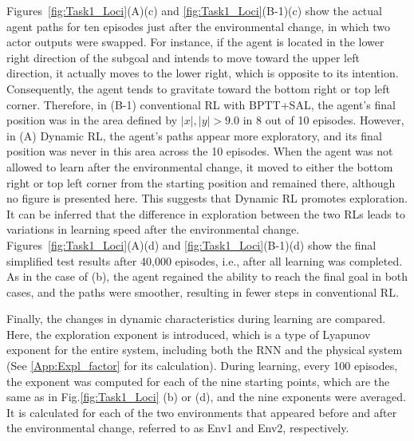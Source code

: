 Figures~\ref{fig:Task1_Loci}(A)(c) and \ref{fig:Task1_Loci}(B-1)(c) show the actual agent paths
for ten episodes just after the environmental change,
in which two actor outputs were swapped.
For instance, if the agent is located in the lower right direction of the subgoal
and intends to move toward the upper left direction, it actually moves to the lower right, which is opposite to its intention.
Consequently, the agent tends to gravitate toward the bottom right or top left corner.
Therefore, in (B-1) conventional RL with BPTT+SAL,
the agent's final position was in the area defined by $|x|, |y| > 9.0$ in 8 out of 10 episodes.
However, in (A) Dynamic RL, the agent's paths appear more exploratory,
and its final position was never in this area across the 10 episodes.
When the agent was not allowed to learn after the environmental change,
it moved to either the bottom right or top left corner from the starting position and remained there,
although no figure is presented here.
This suggests that Dynamic RL promotes exploration.
It can be inferred that the difference in exploration between the two RLs leads to variations in learning speed
after the environmental change.
Figures~\ref{fig:Task1_Loci}(A)(d) and \ref{fig:Task1_Loci}(B-1)(d) show the final simplified test results
after 40,000 episodes, i.e., after all learning was completed.
As in the case of (b), the agent regained the ability to reach the final goal in both cases,
and the paths were smoother, resulting in fewer steps in conventional RL.

Finally, the changes in dynamic characteristics during learning are compared.
Here, the exploration exponent is introduced, which is a type of Lyapunov exponent for the entire system, including
both the RNN and the physical system (See \ref{App:Expl_factor} for its calculation).
During learning, every 100 episodes, the exponent was computed for each of the nine starting points,
which are the same as in Fig.\ref{fig:Task1_Loci} (b) or (d), and the nine exponents were averaged.
It is calculated for each of the two environments that appeared before and after the environmental change,
referred to as Env1 and Env2, respectively.

